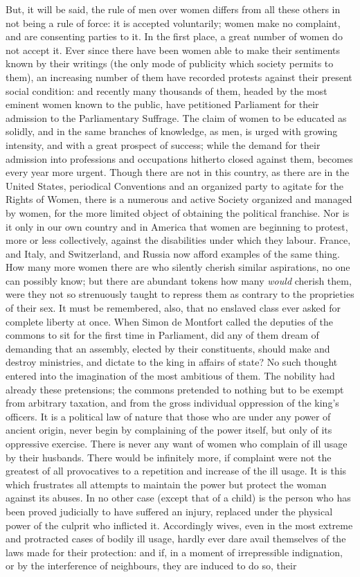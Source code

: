 \documentclass[12pt]{report}
\begin{document}
But, it will be said, the rule of men over women differs from all these others in not being a rule of force: it is accepted voluntarily; women make no complaint, and are consenting parties to it. In the first place, a great number of women do not accept it. Ever since there have been women able to make their sentiments known by their writings (the only mode of publicity which society permits to them), an increasing number of them have recorded protests against their present social condition: and recently many thousands of them, headed by the most eminent women known to the public, have petitioned Parliament for their admission to the Parliamentary Suffrage. The claim of women to be educated as solidly, and in the same branches of knowledge, as men, is urged with growing intensity, and with a great prospect of success; while the demand for their admission into professions and occupations hitherto closed against them, becomes every year more urgent. Though there are not in this country, as there are in the United States, periodical Conventions and an organized party to agitate for the Rights of Women, there is a numerous and active Society organized and managed by women, for the more limited object of obtaining the political franchise. Nor is it only in our own country and in America that women are beginning to protest, more or less collectively, against the disabilities under which they labour. France, and Italy, and Switzerland, and Russia now afford examples of the same thing. How many more women there are who silently cherish similar aspirations, no one can possibly know; but there are abundant tokens how many \emph{would} cherish them, were they not so strenuously taught to repress them as contrary to the proprieties of their sex. It must be remembered, also, that no enslaved class ever asked for complete liberty at once. When Simon de Montfort called the deputies of the commons to sit for the first time in Parliament, did any of them dream of demanding that an assembly, elected by their constituents, should make and destroy ministries, and dictate to the king in affairs of state? No such thought entered into the imagination of the most ambitious of them. The nobility had already these pretensions; the commons pretended to nothing but to be exempt from arbitrary taxation, and from the gross individual oppression of the king's officers. It is a political law of nature that those who are under any power of ancient origin, never begin by complaining of the power itself, but only of its oppressive exercise. There is never any want of women who complain of ill usage by their husbands. There would be infinitely more, if complaint were not the greatest of all provocatives to a repetition and increase of the ill usage. It is this which frustrates all attempts to maintain the power but protect the woman against its abuses. In no other case (except that of a child) is the person who has been proved judicially to have suffered an injury, replaced under the physical power of the culprit who inflicted it. Accordingly wives, even in the most extreme and protracted cases of bodily ill usage, hardly ever dare avail themselves of the laws made for their protection: and if, in a moment of irrepressible indignation, or by the interference of neighbours, they are induced to do so, their 
\end{document}
